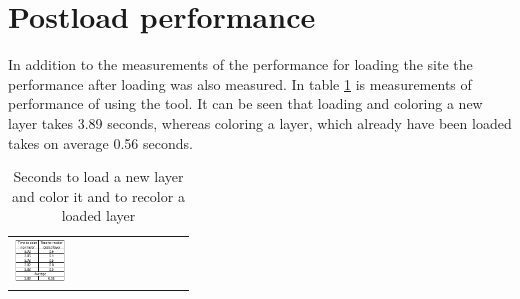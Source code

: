 \section{Postload performance}

In addition to the measurements of the performance for loading the site the performance after loading was also measured. In table \ref{tabPostloadPerformance} is measurements of performance of using the tool. It can be seen that loading and coloring a new layer takes 3.89 seconds, whereas coloring a layer, which already have been loaded takes on average 0.56 seconds. 

\begin{table}[htbp]
	\centering
	\begin{tabular}{l}
		\includegraphics[width=0.3\textwidth]{Pictures/tabPostloadPerformance}
	\end{tabular}
	\caption{Seconds to load a new layer and color it and to recolor a loaded layer}
	\label{tabPostloadPerformance}
\end{table}